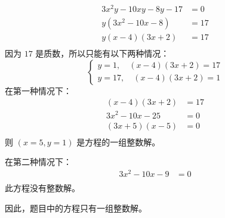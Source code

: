 \documentclass[answers]{exam}
\begin{document}
\begin{questions}
	\begin{solution}
		\begin{align*}
			3x^2y - 10xy - 8y - 17 & = 0  \\
			y(3x^2 - 10x - 8)      & = 17 \\
			y(x-4)(3x+2)           & = 17 \\
		\end{align*}
		因为 \( 17 \) 是质数，所以只能有以下两种情况：
		\begin{equation*}
			\begin{cases}
				y = 1, \quad (x-4)(3x+2) = 17 \\
				y = 17,\quad  (x-4)(3x+2) = 1
			\end{cases}
		\end{equation*}
		在第一种情况下：
		\begin{align*}
			(x-4)(3x+2)     & = 17 \\
			3x^2 -10x - 25  & = 0  \\
			(3x + 5)(x - 5) & = 0  \\
		\end{align*}
		则 \( (x=5, y=1) \) 是方程的一组整数解。

		在第二种情况下：
		\begin{align*}
			3x^2 - 10x - 9 & = 0 \\
		\end{align*}
		此方程没有整数解。

		因此，题目中的方程只有一组整数解。
	\end{solution}

\end{questions}
\end{document}
